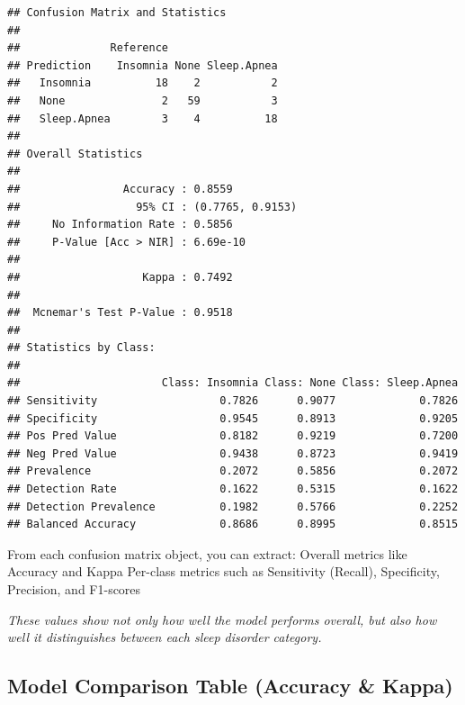 \documentclass[
]{article}
\begin{document}
\begin{verbatim}
## Confusion Matrix and Statistics
## 
##              Reference
## Prediction    Insomnia None Sleep.Apnea
##   Insomnia          18    2           2
##   None               2   59           3
##   Sleep.Apnea        3    4          18
## 
## Overall Statistics
##                                           
##                Accuracy : 0.8559          
##                  95% CI : (0.7765, 0.9153)
##     No Information Rate : 0.5856          
##     P-Value [Acc > NIR] : 6.69e-10        
##                                           
##                   Kappa : 0.7492          
##                                           
##  Mcnemar's Test P-Value : 0.9518          
## 
## Statistics by Class:
## 
##                      Class: Insomnia Class: None Class: Sleep.Apnea
## Sensitivity                   0.7826      0.9077             0.7826
## Specificity                   0.9545      0.8913             0.9205
## Pos Pred Value                0.8182      0.9219             0.7200
## Neg Pred Value                0.9438      0.8723             0.9419
## Prevalence                    0.2072      0.5856             0.2072
## Detection Rate                0.1622      0.5315             0.1622
## Detection Prevalence          0.1982      0.5766             0.2252
## Balanced Accuracy             0.8686      0.8995             0.8515
\end{verbatim}

From each confusion matrix object, you can extract: Overall metrics like
Accuracy and Kappa Per-class metrics such as Sensitivity (Recall),
Specificity, Precision, and F1-scores

\emph{These values show not only how well the model performs overall,
but also how well it distinguishes between each sleep disorder
category.}

\subsection{Model Comparison Table (Accuracy \&
Kappa)}\label{model-comparison-table-accuracy-kappa}
\end{document}
